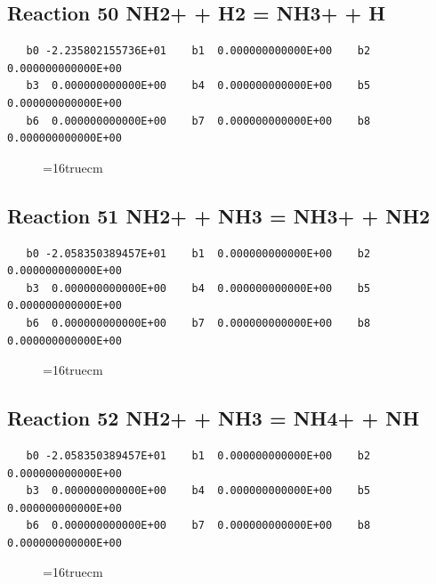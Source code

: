 \documentclass[12pt,dvipdfm]{article}
\begin{document}
\subsection{
Reaction 50 NH2+ + H2 = NH3+ + H}
\begin{small}\begin{verbatim}
   b0 -2.235802155736E+01    b1  0.000000000000E+00    b2  0.000000000000E+00
   b3  0.000000000000E+00    b4  0.000000000000E+00    b5  0.000000000000E+00
   b6  0.000000000000E+00    b7  0.000000000000E+00    b8  0.000000000000E+00
   \end{verbatim}\end{small}
\begin{figure}[h!]
\label{n2rates}
\epsfxsize=16truecm
\end{figure}
\newpage

\subsection{
Reaction 51 NH2+ + NH3 = NH3+ + NH2}
\begin{small}\begin{verbatim}
   b0 -2.058350389457E+01    b1  0.000000000000E+00    b2  0.000000000000E+00
   b3  0.000000000000E+00    b4  0.000000000000E+00    b5  0.000000000000E+00
   b6  0.000000000000E+00    b7  0.000000000000E+00    b8  0.000000000000E+00
   \end{verbatim}\end{small}
\begin{figure}[h!]
\label{n2rates}
\epsfxsize=16truecm
\end{figure}
\newpage

\subsection{
Reaction 52 NH2+ + NH3 = NH4+ + NH}
\begin{small}\begin{verbatim}
   b0 -2.058350389457E+01    b1  0.000000000000E+00    b2  0.000000000000E+00
   b3  0.000000000000E+00    b4  0.000000000000E+00    b5  0.000000000000E+00
   b6  0.000000000000E+00    b7  0.000000000000E+00    b8  0.000000000000E+00
   \end{verbatim}\end{small}
\begin{figure}[h!]
\label{n2rates}
\epsfxsize=16truecm
\end{figure}
\newpage
\end{document}
